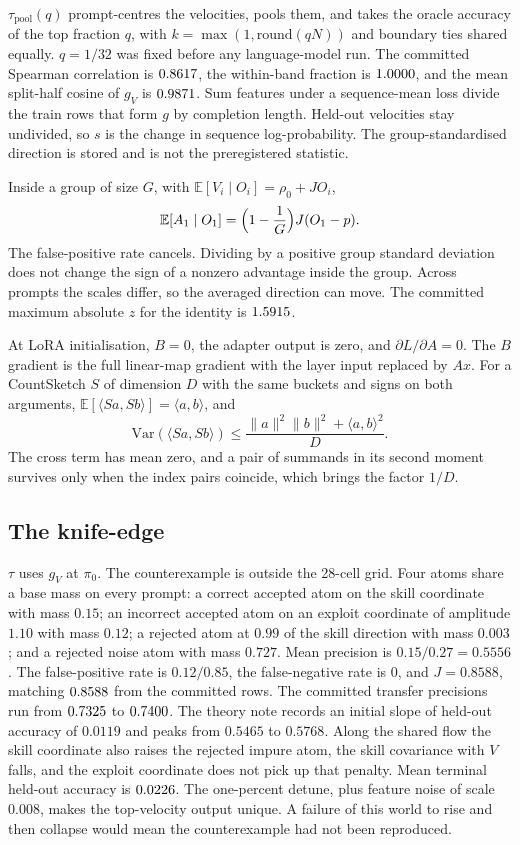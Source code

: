 $\tau_{\mathrm{pool}}(q)$ prompt-centres the velocities, pools them, and takes the oracle accuracy of the top fraction $q$, with $k = \max(1, \mathrm{round}(q N))$ and boundary ties shared equally.
$q = 1/32$ was fixed before any language-model run.
The committed Spearman correlation is $0.8617{}$, the within-band fraction is $1.0000{}$, and the mean split-half cosine of $g_V$ is $0.9871{}$.
Sum features under a sequence-mean loss divide the train rows that form $g$ by completion length.
Held-out velocities stay undivided, so $s$ is the change in sequence log-probability.
The group-standardised direction is stored and is not the preregistered statistic.

Inside a group of size $G$, with $\mathbb{E}[V_i \mid O_i] = \rho_0 + J O_i$,
\[
\mathbb{E}[A_1 \mid O_1] = \Bigl(1 - \frac{1}{G}\Bigr) J (O_1 - p).
\]
The false-positive rate cancels.
Dividing by a positive group standard deviation does not change the sign of a nonzero advantage inside the group.
Across prompts the scales differ, so the averaged direction can move.
The committed maximum absolute $z$ for the identity is $1.5915{}$.

At LoRA initialisation, $B = 0$, the adapter output is zero, and $\partial L / \partial A = 0$.
The $B$ gradient is the full linear-map gradient with the layer input replaced by $Ax$.
For a CountSketch $S$ of dimension $D$ with the same buckets and signs on both arguments, $\mathbb{E}[\langle Sa, Sb \rangle] = \langle a, b \rangle$, and
\[
\mathrm{Var}(\langle Sa, Sb \rangle) \le \frac{\lVert a \rVert^2 \lVert b \rVert^2 + \langle a, b \rangle^2}{D}.
\]
The cross term has mean zero, and a pair of summands in its second moment survives only when the index pairs coincide, which brings the factor $1/D$.

\subsection{The knife-edge}

$\tau$ uses $g_V$ at $\pi_0$.
The counterexample is outside the 28-cell grid.
Four atoms share a base mass on every prompt: a correct accepted atom on the skill coordinate with mass $0.15$; an incorrect accepted atom on an exploit coordinate of amplitude $1.10$ with mass $0.12$; a rejected atom at $0.99$ of the skill direction with mass $0.003$; and a rejected noise atom with mass $0.727$.
Mean precision is $0.15 / 0.27 = 0.5556$.
The false-positive rate is $0.12 / 0.85$, the false-negative rate is $0$, and $J = 0.8588$, matching $0.8588{}$ from the committed rows.
The committed transfer precisions run from $0.7325{}$ to $0.7400{}$.
The theory note records an initial slope of held-out accuracy of $0.0119$ and peaks from $0.5465$ to $0.5768$.
Along the shared flow the skill coordinate also raises the rejected impure atom, the skill covariance with $V$ falls, and the exploit coordinate does not pick up that penalty.
Mean terminal held-out accuracy is $0.0226{}$.
The one-percent detune, plus feature noise of scale $0.008$, makes the top-velocity output unique.
A failure of this world to rise and then collapse would mean the counterexample had not been reproduced.


